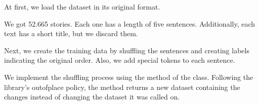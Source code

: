 \documentclass[letterpaper,10pt,english]{jupyterBook}
\begin{document}
\sphinxAtStartPar
At first, we load the dataset in its original format.
\begin{sphinxVerbatimInput}

\begin{sphinxVerbatim}[commandchars=\\\{\}]
  
\end{sphinxVerbatim}
\end{sphinxVerbatimInput}

\sphinxAtStartPar
We got 52.665 stories. Each one has a length of five sentences. Additionally, each text has a short title, but we discard them.
\begin{sphinxVerbatimInput}

\begin{sphinxVerbatim}[commandchars=\\\{\}]
\end{sphinxVerbatim}
\end{sphinxVerbatimInput}
\begin{sphinxVerbatimInput}

\begin{sphinxVerbatim}[commandchars=\\\{\}]
\PYG{p}{[}\PYG{p}{]}
\end{sphinxVerbatim}
\end{sphinxVerbatimInput}

\sphinxAtStartPar
Next, we create the training data by shuffling the sentences and creating labels indicating the original order. Also, we add special tokens to each sentence.

\sphinxAtStartPar
We implement the shuffling process using the \sphinxhyphen{}method of the \sphinxhyphen{}class.
Following the library’s out\sphinxhyphen{}of\sphinxhyphen{}place policy, the \sphinxhyphen{}method returns a new dataset containing the changes instead of changing the dataset it was called on.
\end{document}
